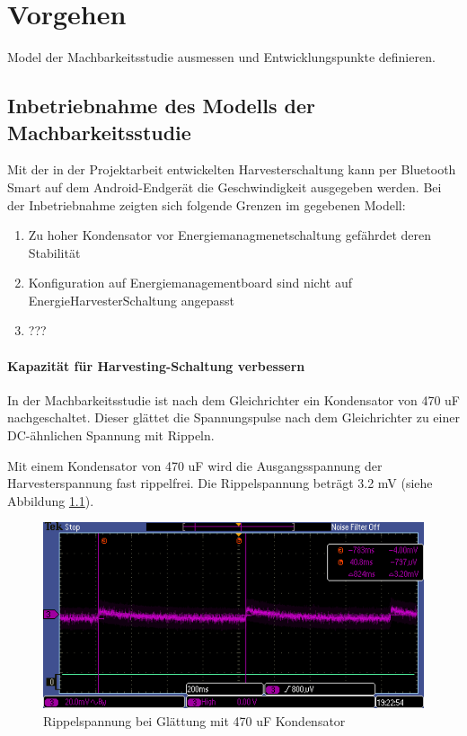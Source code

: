 \chapter{Vorgehen}
Model der Machbarkeitsstudie ausmessen und Entwicklungspunkte definieren.

\section{Inbetriebnahme des Modells der Machbarkeitsstudie}
Mit der in der Projektarbeit entwickelten Harvesterschaltung kann per Bluetooth Smart auf dem Android-Endgerät die Geschwindigkeit ausgegeben werden.
Bei der Inbetriebnahme zeigten sich folgende Grenzen im gegebenen Modell:

\begin{enumerate}
    \item Zu hoher Kondensator vor Energiemanagmenetschaltung gefährdet deren Stabilität
    \item Konfiguration auf Energiemanagementboard sind nicht auf EnergieHarvesterSchaltung angepasst
    \item ???
\end{enumerate}



\subsubsection{Kapazität für Harvesting-Schaltung verbessern}
In der Machbarkeitsstudie ist nach dem Gleichrichter ein Kondensator von 470 uF nachgeschaltet. Dieser glättet die Spannungspulse nach dem Gleichrichter zu einer DC-ähnlichen Spannung mit Rippeln.

Mit einem Kondensator von 470 uF wird die Ausgangsspannung der Harvesterspannung fast rippelfrei. Die Rippelspannung beträgt 3.2 mV (siehe Abbildung \ref{kond470uF}).
\begin{figure}
    \includegraphics[bb = 0 0 100 100]{3Vorgehen/imag/470uF.PNG}
    \caption{Rippelspannung bei Glättung mit 470 uF Kondensator}\label{kond470uF} 
\end{figure}

